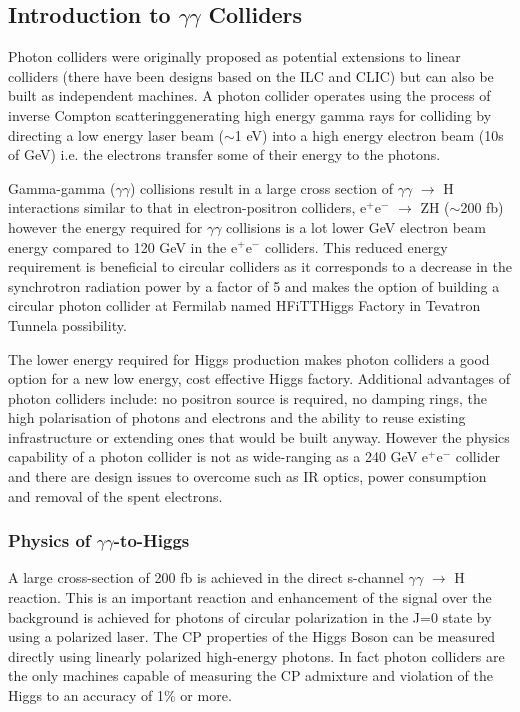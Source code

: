 \subsection{Introduction to $\gamma\gamma$ Colliders}
Photon colliders were originally proposed as potential extensions to linear colliders (there have been designs based on the ILC and CLIC\cite{CLIC:Multilinear}) but can also be built as independent machines. A photon collider operates using the process of inverse Compton scattering\textemdash generating  high energy gamma rays for colliding by directing a low energy laser beam ($\sim$1 eV) into a high energy electron beam (10s of GeV) i.e. the electrons transfer some of their energy to the photons\cite{Chou:Higgs}.

Gamma-gamma ($\gamma\gamma$) collisions result in a large cross section of $\gamma\gamma$ $\rightarrow$ H interactions similar to that in electron-positron colliders, e$^{+}$e$^{-}$ $\rightarrow$ ZH ($\sim$200 fb)\cite{Chou:Higgs} however the energy required for $\gamma\gamma$ collisions is a lot lower GeV electron beam energy compared to 120 GeV in the e$^{+}$e$^{-}$ colliders. This reduced energy requirement is beneficial to circular colliders as it corresponds to a decrease in the synchrotron radiation power by a factor of 5 and makes the option of building a circular photon collider at Fermilab named HFiTT\textemdash Higgs Factory in Tevatron Tunnel\textemdash a possibility\cite{Chou:Higgs}. 

The lower energy required for Higgs production makes photon colliders a good option for a new low energy, cost effective Higgs factory. Additional advantages of photon colliders include: no positron source is required, no damping rings, the high polarisation of photons and electrons and the ability to reuse existing infrastructure or extending ones that would be built anyway. However the physics capability of a photon collider is not as wide-ranging as a 240 GeV e$^{+}$e$^{-}$ collider and there are design issues to overcome such as IR optics, power consumption and removal of the spent electrons\cite{Blondel:HiggsF}.
 
\subsubsection{Physics of $\gamma\gamma$-to-Higgs}
A large cross-section of 200 fb is achieved in the direct s-channel $\gamma\gamma$ $\rightarrow$ H reaction. This is an important reaction and enhancement of the signal over the background is achieved for photons of circular polarization in the J=0 state by using a polarized laser\cite{Blondel:HiggsF}.  The CP properties of the Higgs Boson can be measured directly using linearly polarized high-energy photons. In fact photon colliders are the only machines capable of measuring the CP admixture and violation of the Higgs to an accuracy of 1\% or more\cite{Chou:Higgs}.

